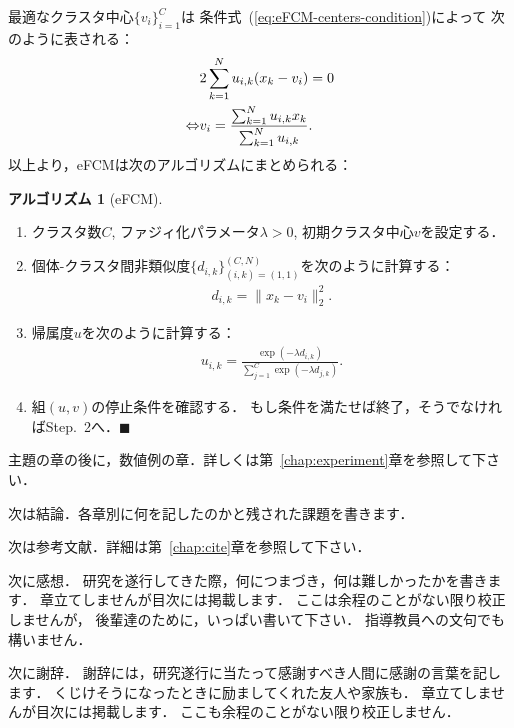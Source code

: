 \documentclass[a4j,12pt,dvipdfmx,oneside]{jsbook}
\theoremstyle{definition}
\newtheorem{Alg}[theorem]{アルゴリズム}
\newcommand{\QED}{\hfill$\blacksquare$\par}
\begin{document}
\begin{breakbox}
最適なクラスタ中心$\{v_i\}_{i=1}^C$は
条件式~(\ref{eq:eFCM-centers-condition})によって
次のように表される：
\begin{align}
&2\sum_{k=1}^Nu_{i,k}(x_k-v_i)=0\notag\\
\Leftrightarrow&v_i=\frac{\sum_{k=1}^Nu_{i,k}x_k}{\sum_{k=1}^Nu_{i,k}}.
\label{eq:eFCM-centers}
\end{align}
以上より，eFCMは次のアルゴリズムにまとめられる：
\begin{Alg}[eFCM]~\par
 \label{alg:eFCM}
\begin{enumerate}
\setlength{\itemindent}{3em}
\renewcommand{\theenumi}{\arabic{enumi}}
\renewcommand{\labelenumi}{\textsc{Step~\theenumi.}}
\item
クラスタ数$C$,
ファジィ化パラメータ$\lambda>0$,
初期クラスタ中心$v$を設定する．
\item
個体-クラスタ間非類似度$\{d_{i,k}\}_{(i,k)=(1,1)}^{(C,N)}$を次のように計算する：
\begin{align}
d_{i,k}=\|x_k-v_i\|_2^2.\label{eq:eFCM-dissimilarities}
\end{align}
\item
帰属度$u$を次のように計算する：
\begin{align}
u_{i,k}=\frac{
 \exp(-\lambda d_{i,k})
}{
 \sum_{j=1}^C\exp(-\lambda d_{j,k})
}.
\label{eq:eFCM-membership1}
\end{align}
\item
組$(u, v)$の停止条件を確認する．
もし条件を満たせば終了，そうでなければStep.~2へ．\QED
\end{enumerate}
\end{Alg}
\end{breakbox}



主題の章の後に，数値例の章．詳しくは第~\ref{chap:experiment}章を参照して下さい．

次は結論．各章別に何を記したのかと残された課題を書きます．

次は参考文献．詳細は第~\ref{chap:cite}章を参照して下さい．

次に感想．
研究を遂行してきた際，何につまづき，何は難しかったかを書きます．
章立てしませんが目次には掲載します．
ここは余程のことがない限り校正しませんが，
後輩達のために，いっぱい書いて下さい．
指導教員への文句でも構いません．

次に謝辞．
謝辞には，研究遂行に当たって感謝すべき人間に感謝の言葉を記します．
くじけそうになったときに励ましてくれた友人や家族も．
章立てしませんが目次には掲載します．
ここも余程のことがない限り校正しません．
\end{document}
